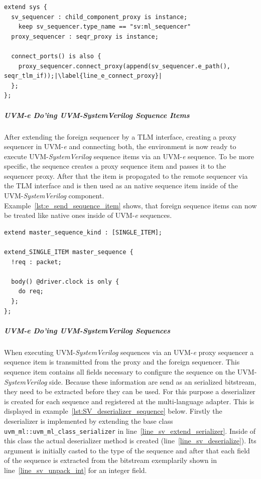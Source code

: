 \lstset{language=e, numbers = left, escapechar=|, breaklines=true}
\begin{lstlisting}[frame=htrbl, caption={\textit{e}: connecting the proxy sequencer and foreign sequencer},
label={lst:e_connect_proxy}]
extend sys {
  sv_sequencer : child_component_proxy is instance;
    keep sv_sequencer.type_name == "sv:ml_sequencer"
  proxy_sequencer : seqr_proxy is instance;
  
  connect_ports() is also {
    proxy_sequencer.connect_proxy(append(sv_sequencer.e_path(), seqr_tlm_if));|\label{line_e_connect_proxy}|
  }; 
};
\end{lstlisting}
\subparagraph{UVM-\textit{e} Do'ing UVM-SystemVerilog Sequence Items}
After extending the foreign sequencer by a TLM interface, creating a proxy sequencer in UVM-\textit{e} and connecting both, the environment is now ready to execute UVM-\emph{SystemVerilog} sequence items via an UVM-\textit{e} sequence. To be more specific, the sequence creates a proxy sequence item and passes it to the sequencer proxy. After that the item is propagated to the remote sequencer via the TLM interface and is then used as an native sequence item inside of the UVM-\emph{SystemVerilog} component.\\
Example~\ref{lst:e_send_sequence_item} shows, that foreign sequence items can now be treated like native ones inside of UVM-\textit{e} sequences.
\lstset{language=e, numbers = left, escapechar=|, breaklines=true}
\begin{lstlisting}[frame=htrbl, caption={\textit{e}: sending an UVM-\emph{SystemVerilog} sequence item  from  an UVM-\textit{e} sequence},
label={lst:e_send_sequence_item}]
extend master_sequence_kind : [SINGLE_ITEM];

extend_SINGLE_ITEM master_sequence {
  !req : packet;
  
  body() @driver.clock is only {
    do req;
  };
};
\end{lstlisting}
\subparagraph{UVM-\textit{e} Do'ing UVM-SystemVerilog Sequences}
When executing UVM-\emph{SystemVerilog} sequences via an UVM-\textit{e} proxy sequencer a sequence item is transmitted from the proxy and the foreign sequencer. This sequence item contains all fields necessary to configure the sequence on the UVM-\emph{SystemVerilog} side. Because these information are send as an serialized bitstream, they need to be extracted before they can be used. For this purpose a deserializer is created for each sequence and registered at the multi-language adapter. This is displayed in example~\ref{lst:SV_deserializer_sequence} below. Firstly the deserializer is implemented by extending the base class \lstinline$uvm_ml::uvm_ml_class_serializer$ in line~\ref{line_sv_extend_serializer}. Inside of this class the actual deserializer method is created (line~\ref{line_sv_deserialize}). Its argument is initially casted to the type of the sequence and after that each field of the sequence is extracted from the bitstream exemplarily shown in line~\ref{line_sv_unpack_int} for an integer field.\\
